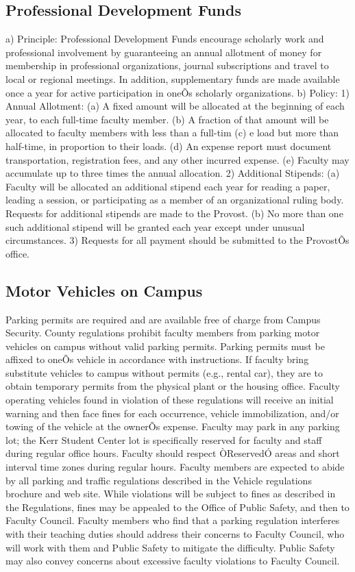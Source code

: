 \documentclass[letterpaper, 11pt]{article}
\begin{document}
	\subsection{Professional Development Funds}
		a) Principle:  Professional Development Funds encourage scholarly work and professional involvement by guaranteeing an annual allotment of money for membership in professional organizations, journal subscriptions and travel to local or regional meetings.  In addition, supplementary funds are made available once a year for active participation in oneÕs scholarly organizations.
		b) Policy:
		1) Annual Allotment:
		(a) A fixed amount will be allocated at the beginning of each year, to each full-time faculty member.
		(b) A fraction of that amount will be allocated to faculty members with less than a full-tim
		(c) e load but more than half-time, in proportion to their loads.
		(d) An expense report must document transportation, registration fees, and any other incurred expense.
		(e) Faculty may accumulate up to three times the annual allocation.
		2) Additional Stipends:
		(a) Faculty will be allocated an additional stipend each year for reading a paper, leading a session, or participating as a member of an organizational ruling body.  Requests for additional stipends are made to the Provost.
		(b) No more than one such additional stipend will be granted each year except under unusual circumstances.
		3) Requests for all payment should be submitted to the ProvostÕs office.
	\subsection{Motor Vehicles on Campus}
		Parking permits are required and are available free of charge from Campus Security.  County regulations prohibit faculty members from parking motor vehicles on campus without valid parking permits.  Parking permits must be affixed to oneÕs vehicle in accordance with instructions.  If faculty bring substitute vehicles to campus without permits (e.g., rental car), they are to obtain temporary permits from the physical plant or the housing office.  Faculty operating vehicles found in violation of these regulations will receive an initial warning and then face fines for each occurrence, vehicle immobilization, and/or towing of the vehicle at the ownerÕs expense.  Faculty may park in any parking lot; the Kerr Student Center lot is specifically reserved for faculty and staff during regular office hours.  Faculty should respect ÒReservedÓ areas and short interval time zones during regular hours.
		Faculty members are expected to abide by all parking and traffic regulations described in the Vehicle regulations brochure and web site.  While violations will be subject to fines as described in the Regulations, fines may be appealed to the Office of Public Safety, and then to Faculty Council.  Faculty members who find that a parking regulation interferes with their teaching duties should address their concerns to Faculty Council, who will work with them and Public Safety to mitigate the difficulty.  Public Safety may also convey concerns about excessive faculty violations to Faculty Council.
\end{document}
